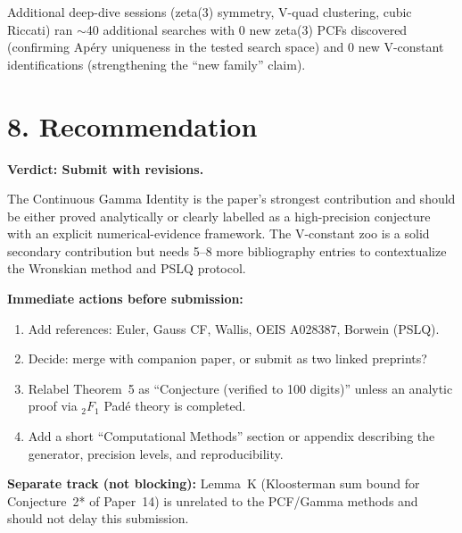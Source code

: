 \documentclass[11pt]{article}
\begin{document}
Additional deep-dive sessions (zeta(3) symmetry, V-quad clustering,
cubic Riccati) ran $\sim$40 additional searches with 0 new zeta(3) PCFs
discovered (confirming Ap\'ery uniqueness in the tested search space)
and 0 new V-constant identifications (strengthening the ``new family'' claim).

\section*{8. Recommendation}

\textbf{Verdict: Submit with revisions.}

The Continuous Gamma Identity is the paper's strongest contribution and should
be either proved analytically or clearly labelled as a high-precision conjecture
with an explicit numerical-evidence framework.
The V-constant zoo is a solid secondary contribution but needs 5--8 more
bibliography entries to contextualize the Wronskian method and PSLQ protocol.

\textbf{Immediate actions before submission:}
\begin{enumerate}[leftmargin=1.5em]
\item Add references: Euler, Gauss CF, Wallis, OEIS A028387, Borwein (PSLQ).
\item Decide: merge with companion paper, or submit as two linked preprints?
\item Relabel Theorem~5 as ``Conjecture (verified to 100 digits)'' unless
  an analytic proof via ${}_2F_1$ Pad\'e theory is completed.
\item Add a short ``Computational Methods'' section or appendix describing
  the generator, precision levels, and reproducibility.
\end{enumerate}

\textbf{Separate track (not blocking):}
Lemma~K (Kloosterman sum bound for Conjecture~2* of Paper~14) is unrelated
to the PCF/Gamma methods and should not delay this submission.
\end{document}

